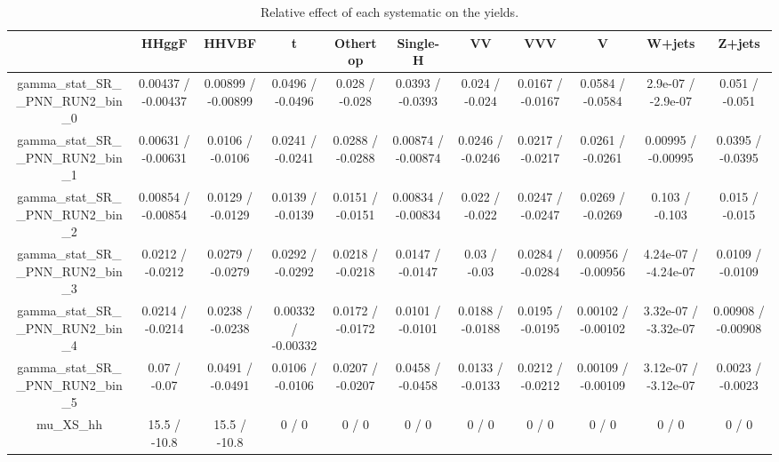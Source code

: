 \documentclass[10pt]{article}
\begin{document}
\begin{table}[htbp]
\begin{center}
\begin{tabular}{|c|c|c|c|c|c|c|c|c|c|c|}
\hline 
      & HHggF      & HHVBF      & t      & Othertop      & Single-H      & VV      & VVV      & V      & W+jets      & Z+jets \\ 
\hline 
  gamma_stat_SR__PNN_RUN2_bin_0 & 0.00437 / -0.00437 & 0.00899 / -0.00899 & 0.0496 / -0.0496 & 0.028 / -0.028 & 0.0393 / -0.0393 & 0.024 / -0.024 & 0.0167 / -0.0167 & 0.0584 / -0.0584 & 2.9e-07 / -2.9e-07 & 0.051 / -0.051 \\ 
  gamma_stat_SR__PNN_RUN2_bin_1 & 0.00631 / -0.00631 & 0.0106 / -0.0106 & 0.0241 / -0.0241 & 0.0288 / -0.0288 & 0.00874 / -0.00874 & 0.0246 / -0.0246 & 0.0217 / -0.0217 & 0.0261 / -0.0261 & 0.00995 / -0.00995 & 0.0395 / -0.0395 \\ 
  gamma_stat_SR__PNN_RUN2_bin_2 & 0.00854 / -0.00854 & 0.0129 / -0.0129 & 0.0139 / -0.0139 & 0.0151 / -0.0151 & 0.00834 / -0.00834 & 0.022 / -0.022 & 0.0247 / -0.0247 & 0.0269 / -0.0269 & 0.103 / -0.103 & 0.015 / -0.015 \\ 
  gamma_stat_SR__PNN_RUN2_bin_3 & 0.0212 / -0.0212 & 0.0279 / -0.0279 & 0.0292 / -0.0292 & 0.0218 / -0.0218 & 0.0147 / -0.0147 & 0.03 / -0.03 & 0.0284 / -0.0284 & 0.00956 / -0.00956 & 4.24e-07 / -4.24e-07 & 0.0109 / -0.0109 \\ 
  gamma_stat_SR__PNN_RUN2_bin_4 & 0.0214 / -0.0214 & 0.0238 / -0.0238 & 0.00332 / -0.00332 & 0.0172 / -0.0172 & 0.0101 / -0.0101 & 0.0188 / -0.0188 & 0.0195 / -0.0195 & 0.00102 / -0.00102 & 3.32e-07 / -3.32e-07 & 0.00908 / -0.00908 \\ 
  gamma_stat_SR__PNN_RUN2_bin_5 & 0.07 / -0.07 & 0.0491 / -0.0491 & 0.0106 / -0.0106 & 0.0207 / -0.0207 & 0.0458 / -0.0458 & 0.0133 / -0.0133 & 0.0212 / -0.0212 & 0.00109 / -0.00109 & 3.12e-07 / -3.12e-07 & 0.0023 / -0.0023 \\ 
  mu_XS_hh & 15.5 / -10.8 & 15.5 / -10.8 & 0 / 0 & 0 / 0 & 0 / 0 & 0 / 0 & 0 / 0 & 0 / 0 & 0 / 0 & 0 / 0 \\ 
\hline 
\end{tabular} 
\caption{Relative effect of each systematic on the yields.} 
\end{center} 
\end{table} 
\end{document}
